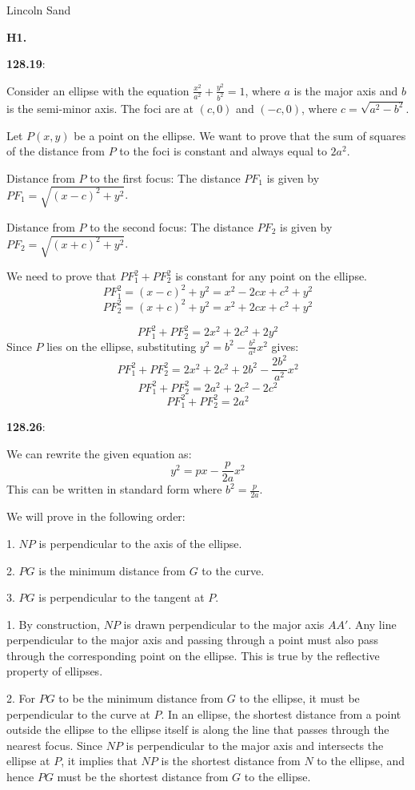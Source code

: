 \documentclass{article}
\begin{document}
\Large{Lincoln Sand}


\textbf{H1.}

\textbf{128.19}:

Consider an ellipse with the equation $\frac{x^2}{a^2} + \frac{y^2}{b^2} = 1$,
where $a$ is the major axis and $b$ is the semi-minor axis. The foci
are at $(c, 0)$ and $(-c, 0)$, where $c = \sqrt{a^2 - b^2}$.

Let $P(x, y)$ be a point on the ellipse. We want to prove that the sum of squares of the distance
from $P$ to the foci is constant and always equal to $2 a^2$.

Distance from $P$ to the first focus:
The distance $P F_1$ is given by $P F_1 = \sqrt{(x-c)^2 + y^2}$.

Distance from $P$ to the second focus:
The distance $P F_2$ is given by $P F_2 = \sqrt{(x+c)^2 + y^2}$.

We need to prove that $P F_1^2 + P F_2^2$ is constant for any point on the ellipse.
\[P F_1^2 = (x-c)^2 + y^2 = x^2 - 2 c x + c^2 + y^2\]
\[P F_2^2 = (x+c)^2 + y^2 = x^2 + 2 c x + c^2 + y^2\]

\[P F_1^2 + P F_2^2 = 2 x^2 + 2 c^2 + 2 y^2\]
Since $P$ lies on the ellipse, substituting $y^2 = b^2 - \frac{b^2}{a^2} x^2$ gives:
\[P F_1^2 + P F_2^2 = 2 x^2 + 2 c^2 + 2 b^2 - \frac{2 b^2}{a^2} x^2\]
\[P F_1^2 + P F_2^2 = 2 a^2 + 2 c^2 - 2 c^2\]
\[P F_1^2 + P F_2^2 = 2 a^2\]

\textbf{128.26}:

We can rewrite the given equation as:
\[y^2 = p x - \frac{p}{2a} x^2\]
This can be written in standard form
where $b^2 = \frac{p}{2a}$.

We will prove in the following order:

1. $N P$ is perpendicular to the axis of the ellipse.

2. $P G$ is the minimum distance from $G$ to the curve.

3. $P G$ is perpendicular to the tangent at $P$.

1. By construction, $N P$ is drawn perpendicular to the major axis
$A A'$. Any line perpendicular to the major axis
and passing through a point must also pass through the corresponding
point on the ellipse. This is true by the reflective property of ellipses.

2. For $P G$ to be the minimum distance from $G$ to the ellipse,
it must be perpendicular to the curve at $P$. In an ellipse,
the shortest distance from a point outside the ellipse to the ellipse
itself is along the line that passes through the nearest focus.
Since $N P$ is perpendicular to the major axis and intersects the ellipse at $P$,
it implies that $N P$ is the shortest distance from $N$ to the ellipse,
and hence $P G$ must be the shortest distance from $G$ to the ellipse.
\end{document}
